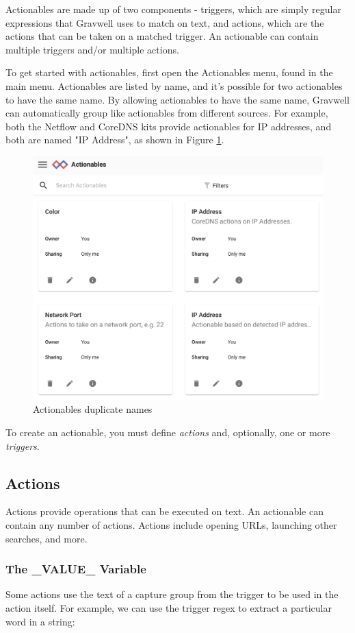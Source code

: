 Actionables are made up of two components - triggers, which are simply regular expressions that Gravwell uses to match on text, and actions, which are the actions that can be taken on a matched trigger. An actionable can contain multiple triggers and/or multiple actions.

To get started with actionables, first open the Actionables menu, found in the main menu. Actionables are listed by name, and it's possible for two actionables to have the same name. By allowing actionables to have the same name, Gravwell can automatically group like actionables from different sources. For example, both the Netflow and CoreDNS kits provide actionables for IP addresses, and both are named "IP Address", as shown in Figure \ref{fig:actionables-menu}.

\begin{figure}[H]
	\includegraphics[width=0.6\linewidth]{images/actionables-menu.png}
	\caption{Actionables duplicate names}
	\label{fig:actionables-menu}
\end{figure}

To create an actionable, you must define \emph{actions} and, optionally, one or more \emph{triggers}.

\subsection{Actions}

Actions provide operations that can be executed on text. An actionable can contain any number of actions. Actions include opening URLs, launching other searches, and more.

\subsubsection{The \_VALUE\_ Variable}

Some actions use the text of a capture group from the trigger to be used in the action itself. For example, we can use the trigger regex to extract a particular word in a string:

